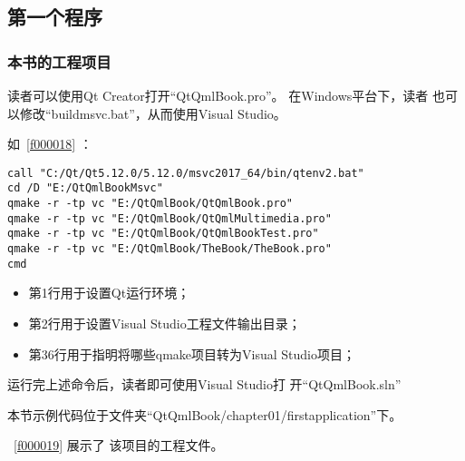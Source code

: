 ﻿




%

\FloatBarrier
\subsection{
第一个程序
}\label{s100210}


\FloatBarrier
\subsubsection{
本书的工程项目
}\label{ss001u10}


读者可以使用Qt Creator打开“QtQmlBook.pro”。
在Windows平台下，读者
也可以修改“build\underline{\hspace{0.5em}}msvc.bat”，从而使用Visual Studio。

如\lstlistingname\ \ref{f000018} ：


\begin{lstlisting}[label=f000018,
caption=GoodLuck,
title=\lstlistingname\ \thelstlisting
]
call "C:/Qt/Qt5.12.0/5.12.0/msvc2017_64/bin/qtenv2.bat"
cd /D "E:/QtQmlBookMsvc"
qmake -r -tp vc "E:/QtQmlBook/QtQmlBook.pro"
qmake -r -tp vc "E:/QtQmlBook/QtQmlMultimedia.pro"
qmake -r -tp vc "E:/QtQmlBook/QtQmlBookTest.pro"
qmake -r -tp vc "E:/QtQmlBook/TheBook/TheBook.pro"
cmd
\end{lstlisting}          %



\begin{itemize}

\item 第1行用于设置Qt运行环境；
\item 第2行用于设置Visual Studio工程文件输出目录；
\item 第3\raisebox{0.16ex}{\sourcefonttwo\~{}}6行用于指明将哪些qmake项目转为Visual Studio项目；

\end{itemize}

运行完上述命令后，读者即可使用Visual Studio打
开“QtQmlBook.sln”

本节示例代码位于文件夹“QtQmlBook/chapter01/firstapplication”下。

\lstlistingname\ \ref{f000019}
展示了
该项目的工程文件。

